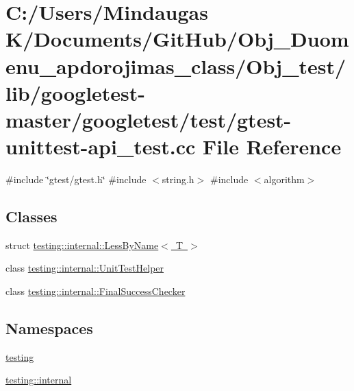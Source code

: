 \hypertarget{_obj__test_2lib_2googletest-master_2googletest_2test_2gtest-unittest-api__test_8cc}{}\section{C\+:/\+Users/\+Mindaugas K/\+Documents/\+Git\+Hub/\+Obj\+\_\+\+Duomenu\+\_\+apdorojimas\+\_\+class/\+Obj\+\_\+test/lib/googletest-\/master/googletest/test/gtest-\/unittest-\/api\+\_\+test.cc File Reference}
\label{_obj__test_2lib_2googletest-master_2googletest_2test_2gtest-unittest-api__test_8cc}
{\ttfamily \#include \char`\"{}gtest/gtest.\+h\char`\"{}}\newline
{\ttfamily \#include $<$string.\+h$>$}\newline
{\ttfamily \#include $<$algorithm$>$}\newline
\subsection*{Classes}
\begin{DoxyCompactItemize}
\item 
struct \mbox{\hyperlink{structtesting_1_1internal_1_1_less_by_name}{testing\+::internal\+::\+Less\+By\+Name$<$ T $>$}}
\item 
class \mbox{\hyperlink{classtesting_1_1internal_1_1_unit_test_helper}{testing\+::internal\+::\+Unit\+Test\+Helper}}
\item 
class \mbox{\hyperlink{classtesting_1_1internal_1_1_final_success_checker}{testing\+::internal\+::\+Final\+Success\+Checker}}
\end{DoxyCompactItemize}
\subsection*{Namespaces}
\begin{DoxyCompactItemize}
\item 
 \mbox{\hyperlink{namespacetesting}{testing}}
\item 
 \mbox{\hyperlink{namespacetesting_1_1internal}{testing\+::internal}}
\end{DoxyCompactItemize}
